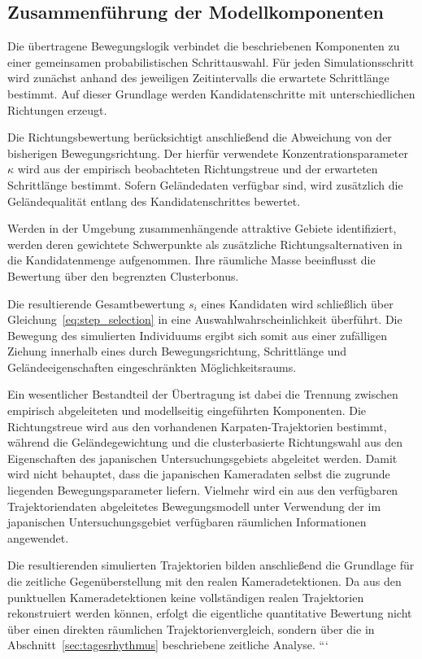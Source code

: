 \documentclass[12pt,a4paper]{report}
\begin{document}
\subsection{Zusammenführung der Modellkomponenten}
\label{subsec:integration_uebertragung}

Die übertragene Bewegungslogik verbindet die beschriebenen Komponenten zu einer
gemeinsamen probabilistischen Schrittauswahl. Für jeden Simulationsschritt wird
zunächst anhand des jeweiligen Zeitintervalls die erwartete Schrittlänge
bestimmt. Auf dieser Grundlage werden Kandidatenschritte mit unterschiedlichen
Richtungen erzeugt.

Die Richtungsbewertung berücksichtigt anschließend die Abweichung von der
bisherigen Bewegungsrichtung. Der hierfür verwendete Konzentrationsparameter
$\kappa$ wird aus der empirisch beobachteten Richtungstreue und der erwarteten
Schrittlänge bestimmt. Sofern Geländedaten verfügbar sind, wird zusätzlich die
Geländequalität entlang des Kandidatenschrittes bewertet.

Werden in der Umgebung zusammenhängende attraktive Gebiete identifiziert, werden
deren gewichtete Schwerpunkte als zusätzliche Richtungsalternativen in die
Kandidatenmenge aufgenommen. Ihre räumliche Masse beeinflusst die Bewertung über
den begrenzten Clusterbonus.

Die resultierende Gesamtbewertung $s_i$ eines Kandidaten wird schließlich über
Gleichung~\eqref{eq:step_selection} in eine Auswahlwahrscheinlichkeit überführt.
Die Bewegung des simulierten Individuums ergibt sich somit aus einer zufälligen
Ziehung innerhalb eines durch Bewegungsrichtung, Schrittlänge und
Geländeeigenschaften eingeschränkten Möglichkeitsraums.

Ein wesentlicher Bestandteil der Übertragung ist dabei die Trennung zwischen
empirisch abgeleiteten und modellseitig eingeführten Komponenten. Die
Richtungstreue wird aus den vorhandenen Karpaten-Trajektorien bestimmt, während
die Geländegewichtung und die clusterbasierte Richtungswahl aus den Eigenschaften
des japanischen Untersuchungsgebiets abgeleitet werden. Damit wird nicht
behauptet, dass die japanischen Kameradaten selbst die zugrunde liegenden
Bewegungsparameter liefern. Vielmehr wird ein aus den verfügbaren
Trajektoriendaten abgeleitetes Bewegungsmodell unter Verwendung der im
japanischen Untersuchungsgebiet verfügbaren räumlichen Informationen
angewendet.

Die resultierenden simulierten Trajektorien bilden anschließend die Grundlage
für die zeitliche Gegenüberstellung mit den realen Kameradetektionen. Da aus
den punktuellen Kameradetektionen keine vollständigen realen Trajektorien
rekonstruiert werden können, erfolgt die eigentliche quantitative Bewertung
nicht über einen direkten räumlichen Trajektorienvergleich, sondern über die
in Abschnitt~\ref{sec:tagesrhythmus} beschriebene zeitliche Analyse.
```
\end{document}
